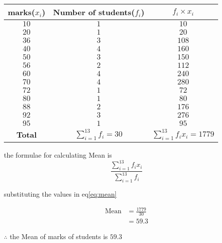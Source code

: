 \documentclass[journal,12pt,twocolumn]{IEEEtran}
\begin{document}
       \begin{table}[!ht]
            \centering
            \resizebox{\columnwidth}{!}
            {
                \begin{tabular}{|c| c| c| }
                \hline
                 marks($x_{i}$) & Number of students($f_{i}$) & $ f_{i}\times x_{i}$ \\
                 \hline
                 $10$   & $1$ & $10$  \\
                 $20$   & $1$ & $20$  \\
                 $36$   & $3$ & $108$ \\
                 $40$   & $4$ & $160$ \\
                 $50$   & $3$ & $150$ \\
                 $56$   & $2$ & $112$ \\
                 $60$   & $4$ & $240$ \\
                 $70$   & $4$ & $280$ \\
                 $72$   & $1$ & $72$  \\
                 $80$   & $1$ & $80$  \\
                 $88$   & $2$ & $176$ \\
                 $92$   & $3$ & $276$ \\
                 $95$   & $1$ & $95$  \\
                 \hline
                    \textbf{Total} & $\sum_{i=1}^{13} f_{i} = 30$ & $\sum_{i=1}^{13} f_{i}x_{i} = 1779$ \\
                 \hline
                \end{tabular}
            }
            \caption{}
            \label{table:table2}
       \end{table}
       
       
       the formulae for calculating Mean is 
         \begin{equation}
          \label{eq:mean}
            \frac {\sum_{i=1}^{13} f_{i}x_{i} }{\sum_{i=1}^{13} f_{i}}
         \end{equation}
         
    substituting the values in eq\eqref{eq:mean} 
 
    \begin{align}
        \text{Mean} &= \frac{1779}{30} \\
                    &= 59.3
    \end{align}
    
    $\therefore$ the Mean of marks of students is $59.3$
    
\end{document}
